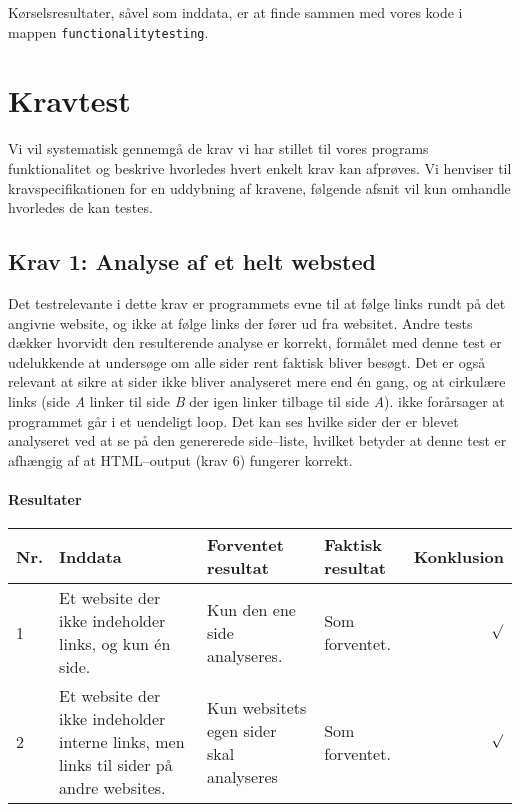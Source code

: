 \documentclass[a4paper,oneside,article]{memoir}
\begin{document}
Kørselsresultater, såvel som inddata, er at finde sammen med vores
kode i mappen \texttt{functionalitytesting}.

\chapter{Kravtest}

Vi vil systematisk gennemgå de krav vi har stillet til vores programs
funktionalitet og beskrive hvorledes hvert enkelt krav kan
afprøves. Vi henviser til kravspecifikationen for en uddybning af
kravene, følgende afsnit vil kun omhandle hvorledes de kan testes.

\begin{landscape}
\section{Krav 1: Analyse af et helt websted}
Det testrelevante i dette krav er programmets evne til at følge links
rundt på det angivne website, og ikke at følge links der fører ud fra
websitet. Andre tests dækker hvorvidt den resulterende analyse er
korrekt, formålet med denne test er udelukkende at undersøge om alle
sider rent faktisk bliver besøgt. Det er også relevant at sikre at
sider ikke bliver analyseret mere end én gang, og at cirkulære links
(side \textit{A} linker til side \textit{B} der igen linker tilbage
til side \textit{A}). ikke forårsager at programmet går i et uendeligt
loop. Det kan ses hvilke sider der er blevet analyseret ved at se på
den genererede side--liste, hvilket betyder at denne test er afhængig
af at HTML--output (krav 6) fungerer korrekt.

\subsubsection{Resultater}
\begin{longtable}[c]{p{20pt}|p{220pt}|p{130pt}|p{130pt}|r}
\textbf{Nr.} &
\textbf{Inddata} &
\textbf{Forventet resultat} &
\textbf{Faktisk resultat} &
\textbf{Konklusion} \\ \hline

1 &
Et website der ikke indeholder links, og kun én side. &
Kun den ene side analyseres. &
Som forventet. &
$\surd$ \\ \hline

2 &
Et website der ikke indeholder interne links, men links til
sider på andre websites. &
Kun websitets egen sider skal analyseres &
Som forventet. &
$\surd$ \\ \hline


\end{longtable}
\end{landscape}
\end{document}

